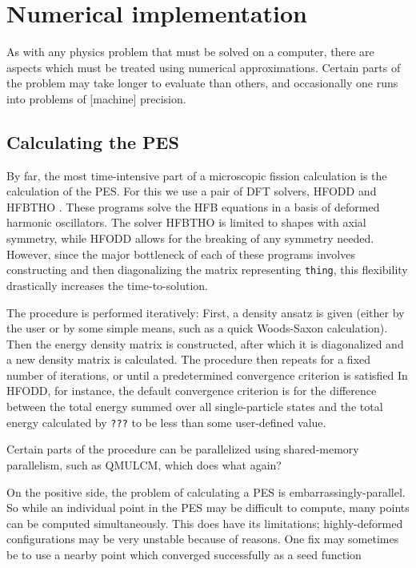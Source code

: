 \chapter{Numerical implementation}\label{chap:Numerical}

As with any physics problem that must be solved on a computer, there are aspects which must be treated using numerical approximations. Certain parts of the problem may take longer to evaluate than others, and occasionally one runs into problems of [machine] precision.

\section{Calculating the PES}
By far, the most time-intensive part of a microscopic fission calculation is the calculation of the PES. For this we use a pair of DFT solvers, HFODD \cite{Schunck2017} and HFBTHO \cite{Perez2017}. These programs solve the HFB equations in a basis of deformed harmonic oscillators. The solver HFBTHO is limited to shapes with axial symmetry, while HFODD allows for the breaking of any symmetry needed. However, since the major bottleneck of each of these programs involves constructing and then diagonalizing the matrix representing \verb|thing|, this flexibility drastically increases the time-to-solution.

The procedure is performed iteratively: First, a density ansatz is given (either by the user or by some simple means, such as a quick Woods-Saxon calculation). Then the energy density matrix is constructed, after which it is diagonalized and a new density matrix is calculated. The procedure then repeats for a fixed number of iterations, or until a predetermined convergence criterion is satisfied In HFODD, for instance, the default convergence criterion is for the difference between the total energy summed over all single-particle states and the total energy calculated by \verb|???| to be less than some user-defined value.

Certain parts of the procedure can be parallelized using shared-memory parallelism, such as QMULCM, which does what again?

On the positive side, the problem of calculating a PES is embarrassingly-parallel. So while an individual point in the PES may be difficult to compute, many points can be computed simultaneously. This does have its limitations; highly-deformed configurations may be very unstable because of reasons. One fix may sometimes be to use a nearby point which converged successfully as a seed function

